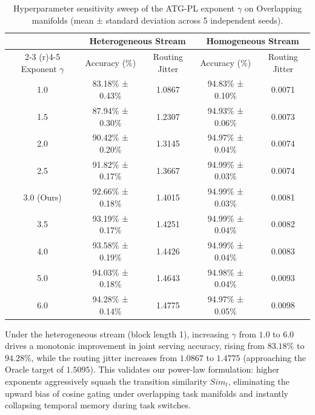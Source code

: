 \begin{table}[h]
\caption{Hyperparameter sensitivity sweep of the ATG-PL exponent $\gamma$ on Overlapping manifolds (mean ± standard deviation across 5 independent seeds).}
\label{tab:sensitivity_sweep}
\vskip 0.15in
\begin{center}
\begin{small}
\begin{sc}
\begin{tabular}{ccccc}
\toprule
& \multicolumn{2}{c}{Heterogeneous Stream} & \multicolumn{2}{c}{Homogeneous Stream} \\
\cmidrule(r){2-3} \cmidrule(r){4-5}
Exponent $\gamma$ & Accuracy (\%) & Routing Jitter & Accuracy (\%) & Routing Jitter \\
\midrule
1.0 & 83.18\% ± 0.43\% & 1.0867 & 94.83\% ± 0.10\% & 0.0071 \\
1.5 & 87.94\% ± 0.30\% & 1.2307 & 94.93\% ± 0.06\% & 0.0073 \\
2.0 & 90.42\% ± 0.20\% & 1.3145 & 94.97\% ± 0.04\% & 0.0074 \\
2.5 & 91.82\% ± 0.17\% & 1.3667 & 94.99\% ± 0.03\% & 0.0074 \\
3.0 (Ours) & 92.66\% ± 0.18\% & 1.4015 & 94.99\% ± 0.03\% & 0.0081 \\
3.5 & 93.19\% ± 0.17\% & 1.4251 & 94.99\% ± 0.04\% & 0.0082 \\
4.0 & 93.58\% ± 0.19\% & 1.4426 & 94.99\% ± 0.04\% & 0.0083 \\
5.0 & 94.03\% ± 0.18\% & 1.4643 & 94.98\% ± 0.04\% & 0.0093 \\
6.0 & 94.28\% ± 0.14\% & 1.4775 & 94.97\% ± 0.05\% & 0.0098 \\
\bottomrule
\end{tabular}
\end{sc}
\end{small}
\end{center}
\vskip -0.1in
\end{table}

Under the heterogeneous stream (block length 1), increasing $\gamma$ from $1.0$ to $6.0$ drives a monotonic improvement in joint serving accuracy, rising from $83.18\%$ to $94.28\%$, while the routing jitter increases from $1.0867$ to $1.4775$ (approaching the Oracle target of $1.5095$). This validates our power-law formulation: higher exponents aggressively squash the transition similarity $Sim_t$, eliminating the upward bias of cosine gating under overlapping task manifolds and instantly collapsing temporal memory during task switches.

